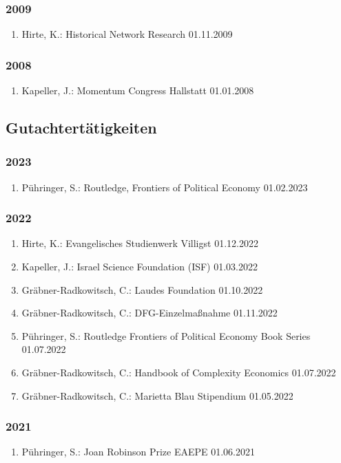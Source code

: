 \subsubsection*{2009}
\begin{enumerate}
	\item Hirte, K.: Historical Network Research 01.11.2009
\end{enumerate}
\subsubsection*{2008}
\begin{enumerate}
	\item Kapeller, J.: Momentum Congress Hallstatt 01.01.2008
\end{enumerate}


\subsection{Gutachtertätigkeiten}
\subsubsection*{2023}
\begin{enumerate}
	\item Pühringer, S.: Routledge, Frontiers of Political Economy 01.02.2023
\end{enumerate}
\subsubsection*{2022}
\begin{enumerate}
	\item Hirte, K.: Evangelisches Studienwerk Villigst 01.12.2022
	\item Kapeller, J.: Israel Science Foundation (ISF) 01.03.2022
	\item Gräbner-Radkowitsch, C.: Laudes Foundation 01.10.2022
	\item Gräbner-Radkowitsch, C.: DFG-Einzelmaßnahme 01.11.2022
	\item Pühringer, S.: Routledge Frontiers of Political Economy Book Series 01.07.2022
	\item Gräbner-Radkowitsch, C.: Handbook of Complexity Economics 01.07.2022
	\item Gräbner-Radkowitsch, C.: Marietta Blau Stipendium 01.05.2022
\end{enumerate}
\subsubsection*{2021}
\begin{enumerate}
	\item Pühringer, S.: Joan Robinson Prize EAEPE 01.06.2021
\end{enumerate}
